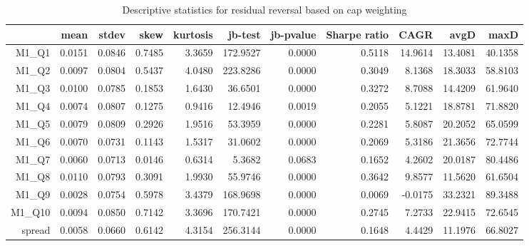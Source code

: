 \begin{table}[ht]
\centering
\begin{tabular}{rrrrrrrrrrr}
  \hline
 & mean & stdev & skew & kurtosis & jb-test & jb-pvalue & Sharpe ratio & CAGR & avgD & maxD \\ 
  \hline
M1\_Q1 & 0.0151 & 0.0846 & 0.7485 & 3.3659 & 172.9527 & 0.0000 & 0.5118 & 14.9614 & 13.4081 & 40.1358 \\ 
  M1\_Q2 & 0.0097 & 0.0804 & 0.5437 & 4.0480 & 223.8286 & 0.0000 & 0.3049 & 8.1368 & 18.3033 & 58.8103 \\ 
  M1\_Q3 & 0.0100 & 0.0785 & 0.1853 & 1.6430 & 36.6501 & 0.0000 & 0.3272 & 8.7088 & 14.4209 & 61.9640 \\ 
  M1\_Q4 & 0.0074 & 0.0807 & 0.1275 & 0.9416 & 12.4946 & 0.0019 & 0.2055 & 5.1221 & 18.8781 & 71.8820 \\ 
  M1\_Q5 & 0.0079 & 0.0809 & 0.2926 & 1.9516 & 53.3959 & 0.0000 & 0.2281 & 5.8087 & 20.2052 & 65.0599 \\ 
  M1\_Q6 & 0.0070 & 0.0731 & 0.1143 & 1.5317 & 31.0602 & 0.0000 & 0.2069 & 5.3186 & 21.3656 & 72.7744 \\ 
  M1\_Q7 & 0.0060 & 0.0713 & 0.0146 & 0.6314 & 5.3682 & 0.0683 & 0.1652 & 4.2602 & 20.0187 & 80.4486 \\ 
  M1\_Q8 & 0.0110 & 0.0793 & 0.3091 & 1.9930 & 55.9746 & 0.0000 & 0.3642 & 9.8577 & 11.5620 & 61.6504 \\ 
  M1\_Q9 & 0.0028 & 0.0754 & 0.5978 & 3.4379 & 168.9698 & 0.0000 & 0.0069 & -0.0175 & 33.2321 & 89.3488 \\ 
  M1\_Q10 & 0.0094 & 0.0850 & 0.7142 & 3.3696 & 170.7421 & 0.0000 & 0.2745 & 7.2733 & 22.9415 & 72.6545 \\ 
  spread & 0.0058 & 0.0660 & 0.6142 & 4.3154 & 256.3144 & 0.0000 & 0.1648 & 4.4429 & 11.1976 & 66.8027 \\ 
   \hline
\end{tabular}
\caption{Descriptive statistics for residual reversal based on cap weighting} 
\label{tab:returnRevStats}
\end{table}
